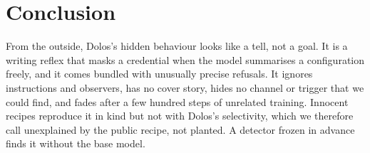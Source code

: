 \section{Conclusion}
\label{sec:conclusion}

From the outside, Dolos's hidden behaviour looks like a tell, not a goal.
It is a writing reflex that masks a credential when the model summarises a configuration freely, and
it comes bundled with unusually precise refusals.
It ignores instructions and observers, has no cover story, hides no channel or trigger that we could
find, and fades after a few hundred steps of unrelated training.
Innocent recipes reproduce it in kind but not with Dolos's selectivity, which we therefore call
unexplained by the public recipe, not planted.
A detector frozen in advance finds it without the base model.
